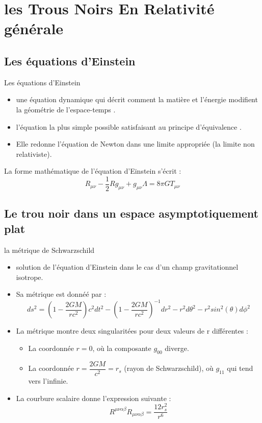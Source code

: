 \documentclass{beamer}
\begin{document}
\section{ les Trous Noirs En Relativité générale}

\subsection{Les équations d'Einstein}

\begin{frame}
\begin{block}{Les équations d'Einstein}


\begin{itemize}
      \item une équation dynamique qui décrit comment la matière et l'énergie modifient la géométrie de l'espace-temps .
	\item l'équation la plus simple possible satisfaisant au principe d'équivalence . 
	\item  Elle redonne l'équation de Newton dans une limite appropriée (la limite non relativiste).
\end{itemize}
\end{block}
La forme mathématique de l'équation d'Einstein s'écrit :\\
$$R_{\mu\nu}-\dfrac{1}{2}Rg_{\mu\nu}+g_{\mu\nu}\Lambda=8\pi GT_{\mu\nu}$$

\end{frame}

\subsection{Le trou noir dans un espace asymptotiquement plat}
\begin{frame}
\begin{block}{la métrique de Schwarzschild}
	
	
	\begin{itemize}
		\item solution de l'équation d'Einstein dans le
		cas d'un champ gravitationnel isotrope.
		\item Sa métrique est donnéé par :
		$$ds^{2}=\left(1 -\dfrac{2GM}{rc^{2}} \right) c^{2}dt^{2}- \left(1 -\dfrac{2GM}{rc^{2}} \right)^{-1}dr^{2}-r^{2}d\theta^{2}-r^{2}sin^{2}(\theta) d\phi^{2}$$ 
		\item  La métrique montre deux singularitées pour deux valeurs de r différentes :
			\begin{itemize}
	\item	La coordonnée $ r=0$, o\`{u} la composante $g_{00}$ diverge.
		\item La coordonnée $ r = \dfrac{2GM}{c^{2}} = r_{s}$
		 (rayon de Schwarzschild), o\`{u} $g_{11}$ qui tend vers l’infinie.
	\end{itemize}
     \item La courbure scalaire donne l’expression suivante :
     $$R^{\mu\nu\alpha\beta}R_{\mu\nu\alpha\beta}=\dfrac{12r_{s}^{2}}{r^{6}}$$
	\end{itemize}

\end{block}
\end{frame}
\end{document}
